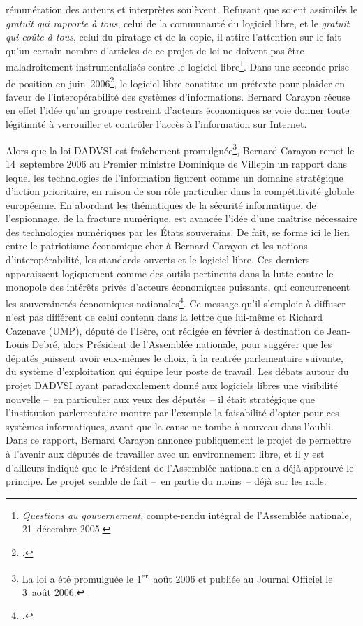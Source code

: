 \documentclass{FramateX}
\begin{document}
\begin{refsection}
rémunération des auteurs et interprètes soulèvent. Refusant que soient
assimilés le \textit{gratuit qui rapporte à tous}, celui de la
communauté du logiciel libre, et le \textit{gratuit qui coûte à tous},
celui du piratage et de la copie, il attire l'attention sur le fait
qu'un certain nombre d'articles de ce projet de loi ne doivent pas être
maladroitement instrumentalisés contre le logiciel
libre\footnote{\textit{Questions au gouvernement}, compte-rendu
intégral de l'Assemblée nationale, 21~décembre 2005.}. Dans une seconde
prise de position en juin~2006\footnote{\cite{rocardencodage2006}.}, le logiciel libre constitue un
prétexte pour plaider en faveur de l'interopérabilité des systèmes
d'informations. Bernard Carayon récuse en effet l'idée qu'un groupe
restreint d'acteurs économiques se voie donner toute légitimité à
verrouiller et contrôler l'accès à l'information sur Internet.

Alors que la loi DADVSI est fraîchement promulguée\footnote{La loi a été
promulguée le 1\textsuperscript{er}~août 2006 et publiée au Journal
Officiel le 3~août 2006.}, Bernard Carayon remet le 14~septembre 2006
au Premier ministre Dominique de Villepin un rapport dans lequel les
technologies de l'information figurent comme un domaine stratégique
d'action prioritaire, en raison de son rôle particulier dans la
compétitivité globale européenne. En abordant les thématiques de la
sécurité informatique, de l'espionnage, de la fracture numérique, est
avancée l'idée d'une maîtrise nécessaire des technologies numériques
par les États souverains. De fait, se forme ici le lien entre le
patriotisme économique cher à Bernard Carayon et les notions
d'interopérabilité, les standards ouverts et le logiciel libre. Ces
derniers apparaissent logiquement comme des outils pertinents dans la
lutte contre le monopole des intérêts privés d'acteurs économiques
puissants, qui concurrencent les souverainetés économiques
nationales\footnote{\cite{carayona2006}.}. Ce message qu'il s'emploie à diffuser n'est pas
différent de celui contenu dans la lettre que lui-même et Richard
Cazenave (UMP), député de l'Isère, ont rédigée en février à destination
de Jean-Louis Debré, alors Président de l'Assemblée nationale, pour
suggérer que les députés puissent avoir eux-mêmes le choix, à la
rentrée parlementaire suivante, du système d'exploitation qui équipe
leur poste de travail. Les débats autour du projet DADVSI ayant
paradoxalement donné aux logiciels libres une visibilité nouvelle –~en
particulier aux yeux des députés~– il était stratégique que
l'institution parlementaire montre par l'exemple la faisabilité d'opter
pour ces systèmes informatiques, avant que la cause ne tombe à nouveau
dans l'oubli. Dans ce rapport, Bernard Carayon annonce publiquement le
projet de permettre à l'avenir aux députés de travailler avec un
environnement libre, et il y est d'ailleurs indiqué que le Président de
l'Assemblée nationale en a déjà approuvé le principe. Le projet semble
de fait –~en partie du moins~– déjà sur les rails. 


\end{refsection}
\end{document}
